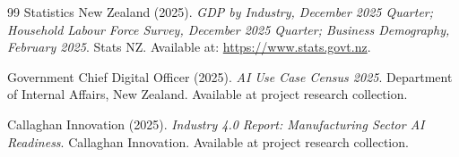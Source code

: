 \documentclass[11pt,a4paper]{article}
\begin{document}
\begin{thebibliography}{99}
Statistics New Zealand (2025). \textit{GDP by Industry, December 2025 Quarter; Household Labour Force Survey, December 2025 Quarter; Business Demography, February 2025}. Stats NZ. Available at: \url{https://www.stats.govt.nz}.

Government Chief Digital Officer (2025). \textit{AI Use Case Census 2025}. Department of Internal Affairs, New Zealand. Available at project research collection.

Callaghan Innovation (2025). \textit{Industry 4.0 Report: Manufacturing Sector AI Readiness}. Callaghan Innovation. Available at project research collection.

\end{thebibliography}
\end{document}

